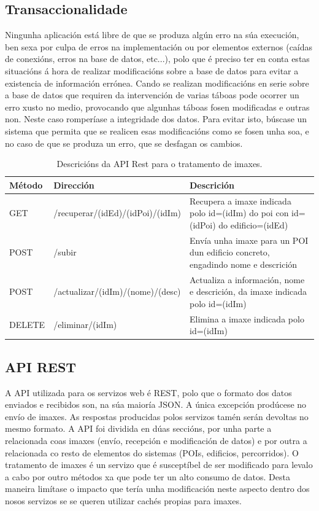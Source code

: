 \subsection{Transaccionalidade}
Ningunha aplicación está libre de que se produza algún erro na súa execución, ben sexa por culpa de erros na implementación ou por elementos externos (caídas de conexións, erros na base de datos, etc...), polo que é preciso ter en conta estas situacións á hora de realizar modificacións sobre a base de datos para evitar a existencia de información errónea. Cando se realizan modificacións en serie sobre a base de datos que requiren da intervención de varias táboas pode ocorrer un erro xusto no medio, provocando que algunhas táboas fosen modificadas e outras non. Neste caso romperíase a integridade dos datos. Para evitar isto, búscase un sistema que permita que se realicen esas modificacións como se fosen unha soa, e no caso de que se produza un erro, que se desfagan os cambios.

\begin{table} [tbh]
	\footnotesize
	\centering
	\begin{tabular}{|l|p{5cm}|p{7cm}|}
		\hline 
		\textbf{Método}	& \textbf{Dirección} & \textbf{Descrición} \\ 
		\hline 
		GET & /recuperar/(idEd)/(idPoi)/(idIm) & Recupera a imaxe indicada polo id=(idIm) do poi con id=(idPoi) do edificio=(idEd) \\ 
		\hline 
		POST & /subir & Envía unha imaxe para un POI dun edificio concreto, engadindo nome e descrición \\ 
		\hline 
		POST & /actualizar/(idIm)/(nome)/(desc) & Actualiza a información, nome e descrición, da imaxe indicada polo id=(idIm) \\ 
		\hline 
		DELETE & /eliminar/(idIm) & Elimina a imaxe indicada polo id=(idIm) \\ 
		\hline 
	\end{tabular}
	\caption{Descricións da API Rest para o tratamento de imaxes.}
	\label{tab:APIImaxes}
\end{table}

\subsection{API REST}
A API utilizada para os servizos web é REST, polo que o formato dos datos enviados e recibidos son, na súa maioría JSON. A única excepción prodúcese no envío de imaxes. As respostas producidas polos servizos tamén serán devoltas no mesmo formato.
A API foi dividida en dúas seccións, por unha parte a relacionada coas imaxes (envío, recepción e modificación de datos) e por outra a relacionada co resto de elementos do sistemas (POIs, edificios, percorridos). O tratamento de imaxes é un servizo que é susceptíbel de ser modificado para levalo a cabo por outro métodos xa que pode ter un alto consumo de datos. Desta maneira limítase o impacto que tería unha modificación neste aspecto dentro dos nosos servizos se se queren utilizar cachés propias para imaxes.

